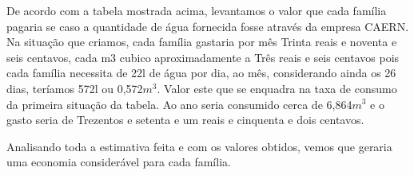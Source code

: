       De acordo com a tabela mostrada acima, levantamos o valor que cada família pagaria se caso a quantidade de água fornecida fosse através da empresa CAERN. Na situação que criamos, cada família gastaria por mês Trinta reais e noventa e seis centavos, cada m3 cubico aproximadamente a Três reais e seis centavos pois cada família necessita de 22l de água por dia, ao mês, considerando ainda os 26 dias, teríamos 572l ou 0,572$m^3$. Valor este que se enquadra na taxa de consumo da primeira situação da tabela. Ao ano seria consumido cerca de 6,864$m^3$ e o gasto seria de Trezentos e setenta e um reais e cinquenta e dois centavos. 
      
      Analisando toda a estimativa feita e com os valores obtidos, vemos que geraria uma economia considerável para cada família.
      
 